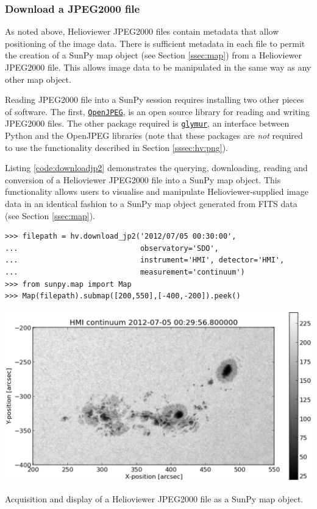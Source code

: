 \subsubsection{Download a JPEG2000 file}\label{sssec:hv:jp}


As noted above, Helioviewer JPEG2000 files contain metadata that allow
positioning of the image data.  There is sufficient metadata in each
file to permit the creation of a SunPy map object (see Section
\ref{ssec:map}) from a Helioviewer JPEG2000 file.  This allows image
data to be manipulated in the same way as any other map object.

Reading JPEG2000 file into a SunPy session requires installing two
other pieces of software. The first, 
\href{http://www.openjpeg.org}{\texttt{OpenJPEG}}, is an open
source library for reading and writing JPEG2000 files.  The other package 
required is 
\href{https://github.com/quintusdias/glymur}{\texttt{glymur}}, an
interface between Python and the OpenJPEG libraries (note that these
packages are {\it not} required to use the functionality described in
Section \ref{sssec:hv:png}).

Listing \ref{code:downloadjp2} demonstrates the querying, downloading,
reading and conversion of a Helioviewer JPEG2000 file into a SunPy map
object.  This functionality allows users to visualise and manipulate
Helioviewer-supplied image data in an identical fashion to a SunPy map
object generated from FITS data (see Section \ref{ssec:map}).

\begin{listing}[H]
\begin{verbatim}
>>> filepath = hv.download_jp2('2012/07/05 00:30:00',
...                            observatory='SDO',
...                            instrument='HMI', detector='HMI', 
...                            measurement='continuum')
>>> from sunpy.map import Map
>>> Map(filepath).submap([200,550],[-400,-200]).peek()
\end{verbatim}
\begin{center}
\includegraphics[width=0.8\columnwidth]{helioviewer_hmi_continuum_jp2_to_map}
\end{center}
\caption{Acquisition and display of a Helioviewer JPEG2000 file as a
  SunPy map object.}
\label{code:downloadjp2}
\end{listing}
